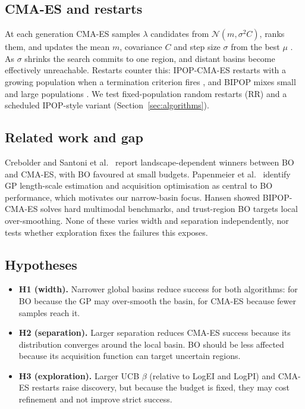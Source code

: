 \documentclass[11pt,a4paper]{article}
\begin{document}
\subsection{CMA-ES and restarts}
At each generation CMA-ES samples $\lambda$ candidates from $\mathcal{N}(m,\sigma^2 C)$, ranks them, and updates the mean $m$, covariance $C$ and step size $\sigma$ from the best $\mu$ \cite{cmatut}. As $\sigma$ shrinks the search commits to one region, and distant basins become effectively unreachable. Restarts counter this: IPOP-CMA-ES restarts with a growing population when a termination criterion fires \cite{auger}, and BIPOP mixes small and large populations \cite{bipop}. We test fixed-population random restarts (RR) and a scheduled IPOP-style variant (Section~\ref{sec:algorithms}).

\subsection{Related work and gap}
Crebolder \cite{crebolder} and Santoni et al.\ \cite{santoni} report landscape-dependent winners between BO and CMA-ES, with BO favoured at small budgets. Papenmeier et al.\ \cite{papenmeier} identify GP length-scale estimation and acquisition optimisation as central to BO performance, which motivates our narrow-basin focus. Hansen \cite{bipop} showed BIPOP-CMA-ES solves hard multimodal benchmarks, and trust-region BO \cite{turbo} targets local over-smoothing. None of these varies width and separation independently, nor tests whether exploration fixes the failures this exposes.

\subsection{Hypotheses}
\begin{itemize}
  \item \textbf{H1 (width).} Narrower global basins reduce success for both algorithms: for BO because the GP may over-smooth the basin, for CMA-ES because fewer samples reach it.
  \item \textbf{H2 (separation).} Larger separation reduces CMA-ES success because its distribution converges around the local basin. BO should be less affected because its acquisition function can target uncertain regions.
  \item \textbf{H3 (exploration).} Larger UCB $\beta$ (relative to LogEI and LogPI) and CMA-ES restarts raise discovery, but because the budget is fixed, they may cost refinement and not improve strict success.
\end{itemize}
\end{document}
